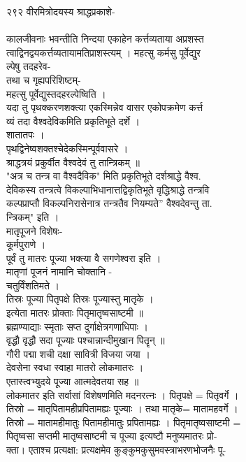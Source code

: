 \documentclass[11pt, openany]{book}
\begin{document}
{{{{{{{{{{{{{{{{{{{{{{{{{{{{{{{{{{{{{{{{{{{{{{{{{{{{{{{{{{{{{{२९२ वीरमित्रोदयस्य श्राद्धप्रकाशे-}{\\
~\\
}{कालजीवनाः भवन्तीति निन्दया एकाहेन कर्त्तव्यताया अप्रशस्त\\
त्वाद्विनद्वयकर्त्तव्यतायामतिप्राशस्त्यम् । महत्सु कर्मसु पूर्वेद्युर\\
ल्पेषु तदहरेव-\\
तथा च गृह्यपरिशिष्टम्-\\
महत्सु पूर्वेद्युस्तदहरल्पेष्विति ।\\
यदा तु पृथक्करणशक्त्या एकस्मिन्नेव वासर एकोपक्रमेण कर्त्त\\
व्यं तदा वैश्वदेविकमिति प्रकृतिभूते दर्शे ।\\
शातातपः ।\\
पृथद्विनेष्वशक्तश्चेदेकस्मिन्पूर्ववासरे ।\\
श्राद्धत्रयं प्रकुर्वीत वैश्वदेवं तु तान्त्रिकम् ॥\\
"अत्र च तन्त्र वा वैश्वदैविक" मिति प्रकृतिभूते दर्शश्राद्धे वैश्व.\\
देविकस्य तन्त्रत्वे विकल्पाभिधानात्तद्विकृतिभूते वृद्धिश्राद्धे
तन्त्रवि\\
कल्पप्राप्तौ विकल्पनिरासेनात्र तन्त्रतैव नियम्यते'' वैश्वदेवन्तु ता.\\
न्त्रिकम्" इति ।\\
मातृपूजने विशेषः-\\
कूर्मपुराणे ।\\
पूर्वं तु मातरः पूज्या भक्त्या वै सगणेश्वरा इति ।\\
मातृणां पूजनं नामानि चोक्तानि -\\
चतुर्विंशतिमते ।\\
तिस्रः पूज्या पितृपक्षे तिस्रः पूज्यास्तु मातृके ।\\
इत्येता मातरः प्रोक्ताः पितृमातृष्वसाष्टमी ॥\\
ब्रह्मण्याद्याः स्मृताः सप्त दुर्गाक्षेत्रगणाधिपाः ।\\
वृद्धौ वृद्धौ सदा पूज्याः पश्चान्नान्दीमुखान पितॄन् ॥\\
गौरी पद्मा शची दक्षा सावित्री विजया जया ।\\
देवसेना स्वधा स्वाहा मातरो लोकमातरः ।\\
एतास्त्वभ्युदये पूज्या आत्मदेवतया सह ॥\\
लोकमातर इति सर्वासां विशेषणमिति मदनरत्नः । पितृपक्षे = पितृवर्गे ।\\
तिस्रो = मातृपितामहीप्रपितामह्यः पूज्याः । तथा मातृके= मातामहवर्गे ।\\
तिस्रो = मातामहीमातुः पितामहीमातुः प्रपितामह्यः । पितृमातृष्वसाष्टमी =\\
पितृष्वसा सप्तमी मातृष्वसाष्टमी च पूज्या इत्यष्टौ मनुष्यमातरः प्रो-\\
क्ता। एताश्च प्रत्यक्षा: प्रत्यक्षमेव कुङ्कुमकुसुमवस्त्राभरणभोजनैः पू-\\


}}}}}}}}}}}}}}}}}}}}}}}}}}}}}}}}}}}}}}}}}}}}}}}}}}}}}}}}}}}}}}
\end{document}
